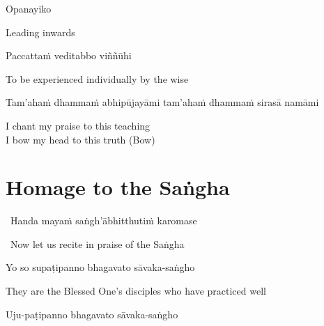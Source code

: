 Opanayiko

\begin{english}
  Leading inwards
\end{english}

Paccattaṁ veditabbo viññūhi

\begin{english}
  To be experienced individually by the wise
\end{english}

\suttaRef{[SN 12.41]}

\ifninebythirteen\clearpage\fi
\begin{pali-hang}
  Tam'ahaṁ dhammaṁ abhipūjayāmi tam'ahaṁ dhammaṁ sirasā namāmi
\end{pali-hang}

\begin{english}
  I chant my praise to this teaching\\
  I bow my head to this truth \hfill{\textnormal{\ifafive\fontsize{12.5}{18}\fi\ifninebythirteen\fontsize{9}{13}\fi\selectfont (Bow)}}
\end{english}

\suttaRef{[Thai]}



\section{Homage to the Saṅgha}
\label{homage-sangha}

\begin{leader}
  \anglebracketleft\ \hspace{-0.5mm}Handa mayaṁ saṅgh'ābhitthutiṁ karomase \hspace{-0.5mm}\anglebracketright\
\end{leader}
\begin{leader-english-below-pali}
  \anglebracketleft\ \hspace{-0.5mm}Now let us recite in praise of the Saṅgha \hspace{-0.5mm}\anglebracketright\
\end{leader-english-below-pali}

Yo so supaṭipanno bhagavato sāvaka-saṅgho

\begin{english-hang}
  They are the Blessed One's disciples who have practiced well
\end{english-hang}

Uju-paṭipanno bhagavato sāvaka-saṅgho

